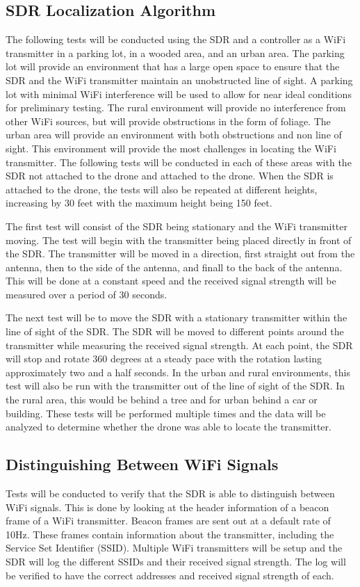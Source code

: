\subsection{SDR Localization Algorithm}
The following tests will be conducted using the SDR and a controller as a WiFi transmitter in a parking lot, in a wooded area, and an urban area. The parking lot will provide an environment that has a large open space to ensure that the SDR and the WiFi transmitter maintain an unobstructed line of sight. A parking lot with minimal WiFi interference will be used to allow for near ideal conditions for preliminary testing. The rural environment will provide no interference from other WiFi sources, but will provide obstructions in the form of foliage. The urban area will provide an environment with both obstructions and non line of sight. This environment will provide the most challenges in locating the WiFi transmitter. The following tests will be conducted in each of these areas with the SDR not attached to the drone and attached to the drone. When the SDR is attached to the drone, the tests will also be repeated at different heights, increasing by 30 feet with the maximum height being 150 feet.\par 
The first test will consist of the SDR being stationary and the WiFi transmitter moving. The test will begin with the transmitter being placed directly in front of the SDR. The transmitter will be moved in a direction, first straight out from the antenna, then to the side of the antenna, and finall to the back of the antenna. This will be done at a constant speed and the received signal strength will be measured over a period of 30 seconds.\par 
The next test will be to move the SDR with a stationary transmitter within the line of sight of the SDR. The SDR will be moved to different points around the transmitter while measuring the received signal strength. At each point, the SDR will stop and rotate 360 degrees at a steady pace with the rotation lasting approximately two and a half seconds. In the urban and rural environments, this test will also be run with the transmitter out of the line of sight of the SDR. In the rural area, this would be behind a tree and for urban behind a car or building. These tests will be performed multiple times and the data will be analyzed to determine whether the drone was able to locate the transmitter.\par 

\subsection{Distinguishing Between WiFi Signals}
Tests will be conducted to verify that the SDR is able to distinguish between WiFi signals. This is done by looking at the header information of a beacon frame of a WiFi transmitter. Beacon frames are sent out at a default rate of 10Hz. These frames contain information about the transmitter, including the Service Set Identifier (SSID). Multiple WiFi transmitters will be setup and the SDR will log the different SSIDs and their received signal strength. The log will be verified to have the correct addresses and received signal strength of each. 

